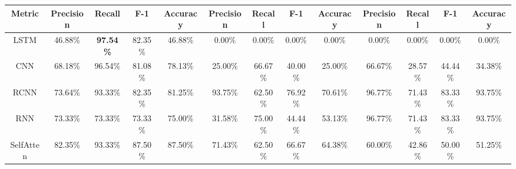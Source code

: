 \begin{table}[]
\begin{tabular}{||c|cccc|cccc|cccc||}
Metric        & \multicolumn{1}{c|}{Precision}         & \multicolumn{1}{c|}{Recall}            & \multicolumn{1}{c|}{F-1}              & Accuracy         & \multicolumn{1}{c|}{Precision}         & \multicolumn{1}{c|}{Recall}            & \multicolumn{1}{c|}{F-1}              & Accuracy         & \multicolumn{1}{c|}{Precision}         & \multicolumn{1}{c|}{Recall}            & \multicolumn{1}{c|}{F-1}              & Accuracy         \\ \hline
LSTM          & \multicolumn{1}{c|}{46.88\%}           & \multicolumn{1}{c|}{\textbf{97.54\%}} & \multicolumn{1}{c|}{82.35\%}          & 46.88\%          & \multicolumn{1}{c|}{0.00\%}            & \multicolumn{1}{c|}{0.00\%}            & \multicolumn{1}{c|}{0.00\%}           & 0.00\%          & \multicolumn{1}{c|}{0.00\%}            & \multicolumn{1}{c|}{0.00\%}            & \multicolumn{1}{c|}{0.00\%}           & 0.00\%          \\ \hline
CNN           & \multicolumn{1}{c|}{68.18\%}           & \multicolumn{1}{c|}{96.54\%} & \multicolumn{1}{c|}{81.08\%}          & 78.13\%          & \multicolumn{1}{c|}{25.00\%}           & \multicolumn{1}{c|}{66.67\%} & \multicolumn{1}{c|}{40.00\%}          & 25.00\%          & \multicolumn{1}{c|}{66.67\%} & \multicolumn{1}{c|}{28.57\%}           & \multicolumn{1}{c|}{44.44\%}          & 34.38\%          \\ \hline
RCNN          & \multicolumn{1}{c|}{73.64\%}           & \multicolumn{1}{c|}{93.33\%}           & \multicolumn{1}{c|}{82.35\%}          & 81.25\%          & \multicolumn{1}{c|}{93.75\%} & \multicolumn{1}{c|}{62.50\%}           & \multicolumn{1}{c|}{76.92\%}          & 70.61\%          & \multicolumn{1}{c|}{96.77\%} & \multicolumn{1}{c|}{71.43\%}  & \multicolumn{1}{c|}{83.33\%} & 93.75\% \\ \hline
RNN           & \multicolumn{1}{c|}{73.33\%}           & \multicolumn{1}{c|}{73.33\%}           & \multicolumn{1}{c|}{73.33\%}          & 75.00\%          & \multicolumn{1}{c|}{31.58\%}           & \multicolumn{1}{c|}{75.00\%}           & \multicolumn{1}{c|}{44.44\%}          & 53.13\%          & \multicolumn{1}{c|}{96.77\%} & \multicolumn{1}{c|}{71.43\%}  & \multicolumn{1}{c|}{83.33\%} & 93.75\% \\ \hline
SelfAtten     & \multicolumn{1}{c|}{82.35\%}           & \multicolumn{1}{c|}{93.33\%}           & \multicolumn{1}{c|}{87.50\%}          & 87.50\%          & \multicolumn{1}{c|}{71.43\%}           & \multicolumn{1}{c|}{62.50\%}           & \multicolumn{1}{c|}{66.67\%}          & 64.38\%          & \multicolumn{1}{c|}{60.00\%}           & \multicolumn{1}{c|}{42.86\%}           & \multicolumn{1}{c|}{50.00\%}          & 51.25\%          \\ \hline

\end{tabular}
\end{table}
